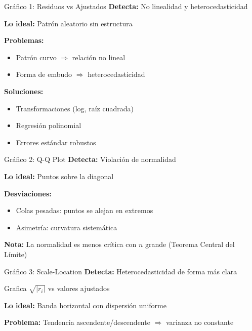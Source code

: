 \documentclass[aspectratio=169]{beamer}
\begin{document}
\begin{frame}{Gráfico 1: Residuos vs Ajustados}
\textbf{Detecta:} No linealidad y heterocedasticidad

\vspace{0.3cm}
\textbf{Lo ideal:} Patrón aleatorio sin estructura

\vspace{0.3cm}
\textbf{Problemas:}
\begin{itemize}
    \item Patrón curvo $\Rightarrow$ relación no lineal
    \item Forma de embudo $\Rightarrow$ heterocedasticidad
\end{itemize}

\vspace{0.5cm}
\textbf{Soluciones:}
\begin{itemize}
    \item Transformaciones (log, raíz cuadrada)
    \item Regresión polinomial
    \item Errores estándar robustos
\end{itemize}
\end{frame}

\begin{frame}{Gráfico 2: Q-Q Plot}
\textbf{Detecta:} Violación de normalidad

\vspace{0.3cm}
\textbf{Lo ideal:} Puntos sobre la diagonal

\vspace{0.3cm}
\textbf{Desviaciones:}
\begin{itemize}
    \item Colas pesadas: puntos se alejan en extremos
    \item Asimetría: curvatura sistemática
\end{itemize}

\vspace{0.5cm}
\textbf{Nota:} La normalidad es menos crítica con $n$ grande (Teorema Central del Límite)
\end{frame}

\begin{frame}{Gráfico 3: Scale-Location}
\textbf{Detecta:} Heterocedasticidad de forma más clara

\vspace{0.3cm}
Grafica $\sqrt{|r_i|}$ vs valores ajustados

\vspace{0.3cm}
\textbf{Lo ideal:} Banda horizontal con dispersión uniforme

\vspace{0.3cm}
\textbf{Problema:} Tendencia ascendente/descendente $\Rightarrow$ varianza no constante
\end{frame}
\end{document}
